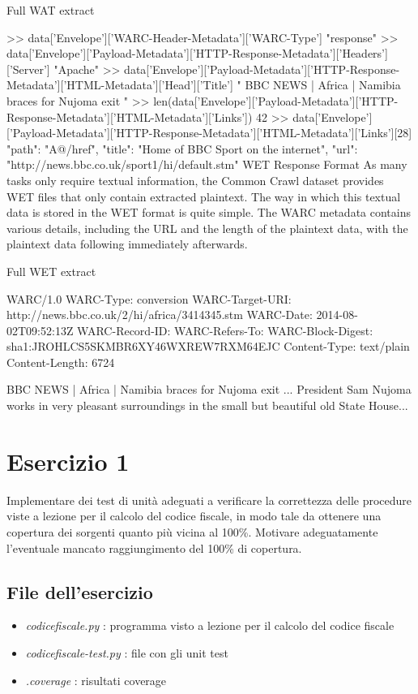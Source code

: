 \documentclass{article}
\newcommand{\filename}[1]{\textit{#1}}
\begin{document}
Full WAT extract

>> data['Envelope']['WARC-Header-Metadata']['WARC-Type']
"response"
>> data['Envelope']['Payload-Metadata']['HTTP-Response-Metadata']['Headers']['Server']
"Apache"
>> data['Envelope']['Payload-Metadata']['HTTP-Response-Metadata']['HTML-Metadata']['Head']['Title']
" BBC NEWS | Africa | Namibia braces for Nujoma exit "
>> len(data['Envelope']['Payload-Metadata']['HTTP-Response-Metadata']['HTML-Metadata']['Links'])
42
>> data['Envelope']['Payload-Metadata']['HTTP-Response-Metadata']['HTML-Metadata']['Links'][28]
{"path": "A@/href", "title": "Home of BBC Sport on the internet", "url": "http://news.bbc.co.uk/sport1/hi/default.stm"}
WET Response Format
As many tasks only require textual information, the Common Crawl dataset provides WET files that only contain extracted plaintext. The way in which this textual data is stored in the WET format is quite simple. The WARC metadata contains various details, including the URL and the length of the plaintext data, with the plaintext data following immediately afterwards.

Full WET extract

WARC/1.0
WARC-Type: conversion
WARC-Target-URI: http://news.bbc.co.uk/2/hi/africa/3414345.stm
WARC-Date: 2014-08-02T09:52:13Z
WARC-Record-ID: 
WARC-Refers-To: 
WARC-Block-Digest: sha1:JROHLCS5SKMBR6XY46WXREW7RXM64EJC
Content-Type: text/plain
Content-Length: 6724

BBC NEWS | Africa | Namibia braces for Nujoma exit
...
President Sam Nujoma works in very pleasant surroundings in the small but beautiful old State House...


\section{Esercizio 1}

\begin{consegna}
Implementare dei test di unità adeguati a verificare la correttezza delle procedure viste a lezione per il calcolo del codice fiscale, in modo tale da ottenere una copertura dei sorgenti quanto più vicina al 100\%. Motivare adeguatamente l’eventuale mancato raggiungimento del 100\% di copertura.
\end{consegna}

\subsection{File dell'esercizio}
\begin{itemize}
    \item \filename{codicefiscale.py} : programma visto a lezione per il calcolo del codice fiscale 
    \item \filename{codicefiscale-test.py} : file con gli unit test
    \item \filename{.coverage} : risultati coverage
\end{itemize}
\end{document}
